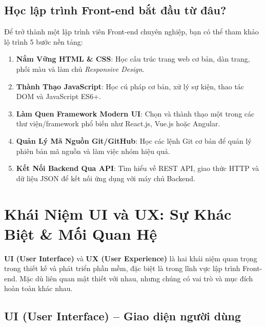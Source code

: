 \documentclass[11pt,oneside]{book}
\newcommand{\term}[1]{\textbf{\textcolor{primaryBlue}{#1}}}
\begin{document}
\subsection{Học lập trình Front-end bắt đầu từ đâu?}

Để trở thành một lập trình viên Front-end chuyên nghiệp, bạn có thể tham khảo lộ trình 5 bước nền tảng:
\begin{conceptBox}
\begin{enumerate}[label=\textbf{\color{conceptBorder}Bước \arabic*:}, leftmargin=4.8em, itemsep=3pt, parsep=0pt, topsep=4pt]
    \item \textbf{Nắm Vững HTML \& CSS}: Học cấu trúc trang web cơ bản, dàn trang, phối màu và làm chủ \textit{Responsive Design}.
    \item \textbf{Thành Thạo JavaScript}: Học cú pháp cơ bản, xử lý sự kiện, thao tác DOM và JavaScript ES6+.
    \item \textbf{Làm Quen Framework Modern UI}: Chọn và thành thạo một trong các thư viện/framework phổ biến như React.js, Vue.js hoặc Angular.
    \item \textbf{Quản Lý Mã Nguồn Git/GitHub}: Học các lệnh Git cơ bản để quản lý phiên bản mã nguồn và làm việc nhóm hiệu quả.
    \item \textbf{Kết Nối Backend Qua API}: Tìm hiểu về REST API, giao thức HTTP và dữ liệu JSON để kết nối ứng dụng với máy chủ Backend.
\end{enumerate}
\end{conceptBox}

\section{Khái Niệm UI và UX: Sự Khác Biệt \& Mối Quan Hệ}
\label{sec:ui_ux_concepts}

\term{UI (User Interface)} và \term{UX (User Experience)} là hai khái niệm quan trọng trong thiết kế và phát triển phần mềm, đặc biệt là trong lĩnh vực lập trình Front-end. Mặc dù liên quan mật thiết với nhau, nhưng chúng có vai trò và mục đích hoàn toàn khác nhau.

\subsection{UI (User Interface) -- Giao diện người dùng}
\end{document}
